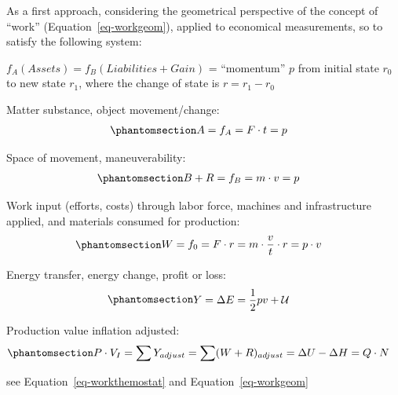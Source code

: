 \documentclass[
  letterpaper,
  DIV=11,
  numbers=noendperiod]{scrartcl}
\begin{document}
\hfill\break
\hfill\break

As a first approach, considering the geometrical perspective of the
concept of ``work'' (Equation~\ref{eq-workgeom}), applied to economical
measurements, so to satisfy the following system:

\(f_A(Assets) = f_B(Liabilities + Gain)\) = ``momentum'' \(p\) from
initial state \(r_0\) to new state \(r_1\), where the change of state is
\(r = r_1 - r_0\)

Matter substance, object movement/change:
\begin{equation}\phantomsection\label{eq-physassets}{\begin{split} &
A = f_A = F \cdot t = p
\end{split}}\end{equation}

Space of movement, maneuverability:
\begin{equation}\phantomsection\label{eq-physliabilities}{\begin{split} &
B + R = f_B = m \cdot v = p
\end{split}}\end{equation}

Work input (efforts, costs) through labor force, machines and
infrastructure applied, and materials consumed for production:
\begin{equation}\phantomsection\label{eq-physexpens}{\begin{split} &
W = f_0 = F \cdot r = m \cdot \frac{v}{t} \cdot r = p \cdot v
\end{split}}\end{equation}

Energy transfer, energy change, profit or loss:
\begin{equation}\phantomsection\label{eq-phyincome}{\begin{split} &
Y = \Delta E = \frac{1}{2} pv + \mathcal{U}
\end{split}}\end{equation}

Production value inflation adjusted:
\begin{equation}\phantomsection\label{eq-physprod}{\begin{split} &
P \cdot V_I = \sum Y_{adjust} = \sum (W + R)_{adjust} = \Delta U - \Delta H = Q \cdot N
\end{split}}\end{equation}

see Equation~\ref{eq-workthemostat} and Equation~\ref{eq-workgeom}
\end{document}
